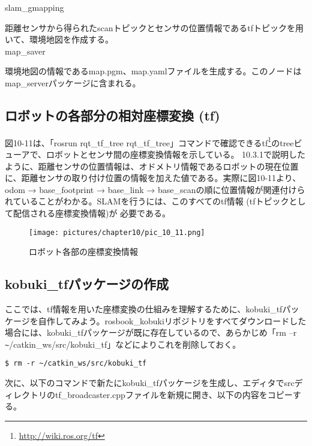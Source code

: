 \circled{\thenum} slam\_gmapping

距離センサから得られたscanトピックとセンサの位置情報であるtfトピックを用いて、環境地図を作成する。\\

\circled{\thenum} map\_saver

環境地図の情報であるmap.pgm、map.yamlファイルを生成する。このノードはmap\_serverパッケージに含まれる。\\

\subsection{ロボットの各部分の相対座標変換 (tf)}

図10-11は、「rosrun rqt\_tf\_tree rqt\_tf\_tree」コマンドで確認できるtf\footnote{\url{http://wiki.ros.org/tf}}のtreeビューアで、ロボットとセンサ間の座標変換情報を示している。
10.3.1で説明したように、距離センサの位置情報は、オドメトリ情報であるロボットの現在位置に、距離センサの取り付け位置の情報を加えた値である。実際に図10-11より、odom → base\_footprint → base\_link → base\_scanの順に位置情報が関連付けられていることがわかる。SLAMを行うには、このすべてのtf情報 (tfトピックとして配信される座標変換情報)が  必要である。

\begin{figure}[htp]
  \centering
  \texttt{[image: pictures/chapter10/pic\_10\_11.png]}
  \caption{ロボット各部の座標変換情報}
\end{figure}

\subsection{kobuki\_tfパッケージの作成}

ここでは、tf情報を用いた座標変換の仕組みを理解するために、kobuki\_tfパッケージを自作してみよう。rosbook\_kobukiリポジトリをすべてダウンロードした場合には、kobuki\_tfパッケージが既に存在しているので、あらかじめ「rm –r \verb|~|/catkin\_ws/src/kobuki\_tf」などによりこれを削除しておく。

\begin{lstlisting}[language=ROS]
$ rm -r ~/catkin_ws/src/kobuki_tf
\end{lstlisting}

次に、以下のコマンドで新たにkobuki\_tfパッケージを生成し、エディタでsrcディレクトリのtf\_broadcaster.cppファイルを新規に開き、以下の内容をコピーする。

